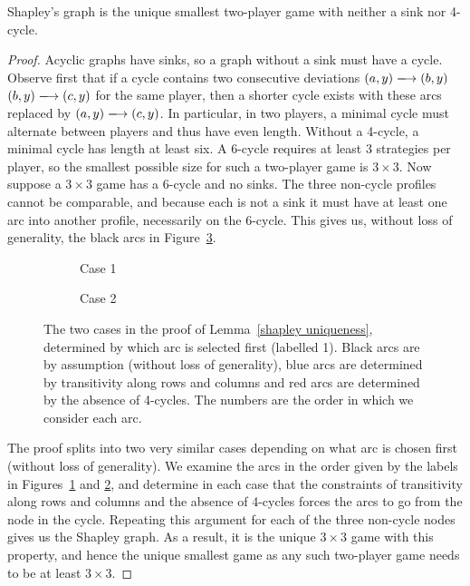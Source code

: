 \documentclass[preprint,authoryear]{elsarticle}
\begin{document}
\begin{lem} \label{shapley uniqueness}
    Shapley's graph is the unique smallest two-player game with neither a sink nor 4-cycle.
\end{lem}
\begin{proof}
    Acyclic graphs have sinks, so a graph without a sink must have a cycle. Observe first that if a cycle contains two consecutive deviations $\arc{(a,y)}{(b,y)}$ $\arc{(b,y)}{(c,y)}$ for the same player, then a shorter cycle exists with these arcs replaced by $\arc{(a,y)}{(c,y)}$. In particular, in two players, a minimal cycle must alternate between players and thus have even length. Without a 4-cycle, a minimal cycle has length at least six. %
    A 6-cycle requires at least 3 strategies per player, so the smallest possible size for such a two-player game is $3\times 3$. Now suppose a $3\times 3$ game has a 6-cycle and no sinks. The three non-cycle profiles cannot be comparable, and because each is not a sink it must have at least one arc into another profile, necessarily on the 6-cycle. This gives us, without loss of generality, the black arcs in Figure~\ref{fig:proof shapley}. 

    \begin{figure}
        \centering
        \begin{subfigure}{.4\textwidth}
            \centering
            
            \caption{Case 1}
            \label{fig:s1}
        \end{subfigure}
        \quad
        \begin{subfigure}{.4\textwidth}
            \centering
            
            \caption{Case 2}
            \label{fig:s2}
        \end{subfigure}
        \caption{The two cases in the proof of Lemma~\ref{shapley uniqueness}, determined by which arc is selected first (labelled 1). Black arcs are by assumption (without loss of generality), blue arcs are determined by transitivity along rows and columns and red arcs are determined by the absence of 4-cycles. The numbers are the order in which we consider each arc.}
        \label{fig:proof shapley}
    \end{figure}

    The proof splits into two very similar cases depending on what arc is chosen first (without loss of generality). We examine the arcs in the order given by the labels in Figures~\ref{fig:s1} and \ref{fig:s2}, and determine in each case that the constraints of transitivity along rows and columns and the absence of 4-cycles forces the arcs to go from the node in the cycle. Repeating this argument for each of the three non-cycle nodes gives us the Shapley graph. As a result, it is the unique $3\times 3$ game with this property, and hence the unique smallest game as any such two-player game needs to be at least $3\times 3$.
\end{proof}
\end{document}
